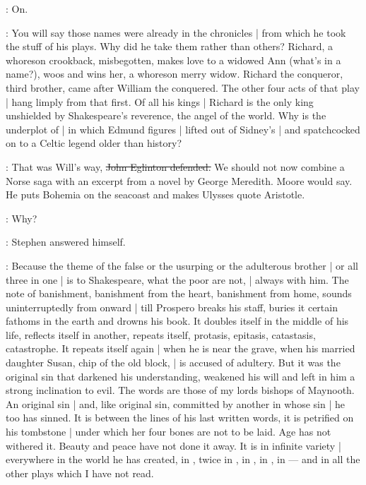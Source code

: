 \StephenInt:
On.

\Stephen:
You will say those names were already in the chronicles |
from which he took the stuff of his plays.
Why did he take them rather than others?
Richard,
a whoreson crookback,
misbegotten,
makes love to a widowed Ann
(what's in a name?),
woos and wins her,
a whoreson merry widow.
Richard the conqueror,
third brother,
came after William the conquered.
The other four acts of that play |
hang limply from that first.
Of all his kings |
Richard is the only king unshielded by Shakespeare's reverence,
the angel of the world.
Why is the underplot of  |
in which Edmund figures |
lifted out of Sidney's  |
and spatchcocked on to a Celtic legend older than history?

\eglinton:
That was Will's way,
\sout{John Eglinton defended.}
We should not now combine a Norse saga with an excerpt from a novel by George Meredith.
Moore would say.
He puts Bohemia on the seacoast and makes Ulysses quote Aristotle.

\Stephen:
Why?

:
Stephen answered himself.

\Stephen:
Because the theme of the false
or the usurping
or the adulterous brother |
or all three in one |
is to Shakespeare,
what the poor are not, |
always with him.
The note of banishment,
banishment from the heart,
banishment from home,
sounds uninterruptedly from  onward |
till Prospero breaks his staff,
buries it certain fathoms in the earth and drowns his book.
It doubles itself in the middle of his life,
reflects itself in another,
repeats itself,
protasis,
epitasis,
catastasis,
catastrophe.
It repeats itself again |
when he is near the grave,
when his married daughter Susan,
chip of the old block, |
is accused of adultery.
But it was the original sin that darkened his understanding,
weakened his will and left in him a strong inclination to evil.
The words are those of my lords bishops of Maynooth.
An original sin |
and, like original sin,
committed by another in whose sin |
he too has sinned.
It is between the lines of his last written words,
it is petrified on his tombstone |
under which her four bones are not to be laid.
Age has not withered it.
Beauty and peace have not done it away.
It is in infinite variety |
everywhere in the world he has created,
in ,
twice in ,
in ,
in ,
in  ---
and in all the other plays which I have not read.

